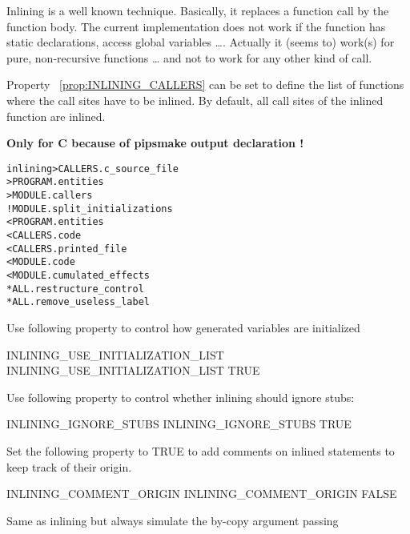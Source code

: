 \documentclass[a4paper]{report}
\newenvironment{PipsMake}{\begin{alltt}}{\end{alltt}}
\newcommand{\PipsPropRef}[1]{\texttt{\detokenize{#1}}~\ref{prop:#1}}
\newenvironment{PipsPass}[1]{\label{pass:#1}}{}
\begin{document}
\begin{PipsPass}{inlining}
Inlining is a well known technique.  Basically, it replaces a function
call by the function body. The current implementation does not work if
the function has static declarations, access global variables \dots.
Actually it (seems to) work(s) for pure, non-recursive functions \dots
and not to work for any other kind of call.

Property \PipsPropRef{INLINING_CALLERS} can be set to define the list of
functions where the call sites have to be inlined. By default, all
call sites of the inlined function are inlined.
\end{PipsPass}

\textbf{Only for C because of pipsmake output declaration !}
\begin{PipsMake}
inlining      > CALLERS.c_source_file
              > PROGRAM.entities
              > MODULE.callers
		! MODULE.split_initializations
        < PROGRAM.entities
        < CALLERS.code
        < CALLERS.printed_file
		< MODULE.code
        < MODULE.cumulated_effects
        * ALL.restructure_control
		* ALL.remove_useless_label
\end{PipsMake}

Use following property to control how generated variables are initialized
\begin{PipsProp}{INLINING_USE_INITIALIZATION_LIST}
INLINING_USE_INITIALIZATION_LIST TRUE
\end{PipsProp}

Use following property to control whether inlining should ignore stubs:
\begin{PipsProp}{INLINING_IGNORE_STUBS}
INLINING_IGNORE_STUBS TRUE
\end{PipsProp}


Set the following property to TRUE to add comments on inlined statements to
keep track of their origin.
\begin{PipsProp}{INLINING_COMMENT_ORIGIN}
INLINING_COMMENT_ORIGIN FALSE
\end{PipsProp}

\begin{PipsPass}{inlining_simple}
Same as inlining but always simulate the by-copy argument passing
\end{PipsPass}
\end{document}
